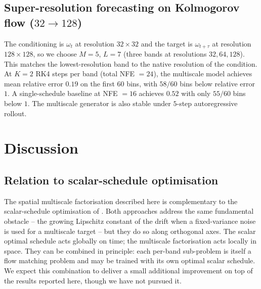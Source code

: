 \documentclass[11pt]{amsart}
\theoremstyle{remark}
\numberwithin{equation}{section}
\begin{document}
\subsection{Super-resolution forecasting on Kolmogorov flow ($32\!\to\!128$)}
The conditioning is $\omega_t$ at resolution $32\times 32$ and the target is $\omega_{t+\tau}$ at resolution $128\times 128$, so we choose $M=5$, $L=7$ (three bands at resolutions $32,64,128$). This matches the lowest-resolution band to the native resolution of the condition. At $K=2$ RK4 steps per band (total NFE $=24$), the multiscale model achieves mean relative error $0.19$ on the first 60 bins, with $58/60$ bins below relative error $1$. A single-schedule baseline at NFE $=16$ achieves $0.52$ with only $55/60$ bins below $1$. The multiscale generator is also stable under $5$-step autoregressive rollout.

\section{Discussion}
\subsection{Relation to scalar-schedule optimisation}
The spatial multiscale factorisation described here is complementary to the scalar-schedule optimisation of \cite{chen2025scale}. Both approaches address the same fundamental obstacle -- the growing Lipschitz constant of the drift when a fixed-variance noise is used for a multiscale target -- but they do so along orthogonal axes. The scalar optimal schedule acts globally on time; the multiscale factorisation acts locally in space. They can be combined in principle: each per-band sub-problem is itself a flow matching problem and may be trained with its own optimal scalar schedule. We expect this combination to deliver a small additional improvement on top of the results reported here, though we have not pursued it.
\end{document}
